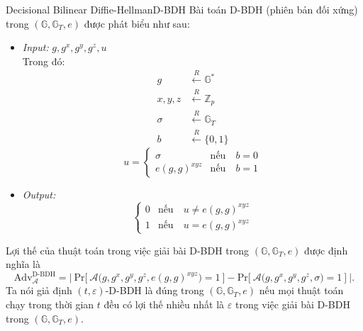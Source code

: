 \documentclass[class=report, crop=false]{standalone}
\begin{document}
		\begin{problem}{Decisional Bilinear Diffie-Hellman}{D-BDH}
			Bài toán D-BDH (phiên bản đối xứng) trong $(\mathbb{G}, \mathbb{G}_T, e)$ được phát biểu như sau:
			\vspace{-\baselineskip}
			\begin{itemize}[leftmargin=1.5cm, itemindent=-0.5cm]
				\item[] \textit{Input:} $g, g^x, g^y, g^z, u$ \\
				Trong đó: \vspace{-\baselineskip}
				\begin{align*}
					g 			&\xleftarrow{R} \mathbb{G}^* 	\\
					x, y, z 	&\xleftarrow{R} \mathbb{Z}_p 	\\
					\sigma 		&\xleftarrow{R} \mathbb{G}_T 	\\
					b 			&\xleftarrow{R} \{ 0, 1 \}
				\end{align*}
				\[
					u = \begin{cases}
						\sigma 			&\text{nếu}\quad b = 0 \\
						e(g, g)^{xyz} 	&\text{nếu}\quad b = 1
					\end{cases}
				\]
				\item[] \textit{Output:}
				\[
					\begin{cases}
						0 &\text{nếu}\quad u \neq e(g, g)^{xyz} \\
						1 &\text{nếu}\quad u = e(g, g)^{xyz}
					\end{cases}
				\]
			\end{itemize}
			\vspace{-\baselineskip}\par
			Lợi thế của thuật toán \algo trong việc giải bài D-BDH trong $(\mathbb{G}, \mathbb{G}_T, e)$ được định nghĩa là
			\[
					\text{Adv}_{\mathcal{A}}^{\text{D-BDH}} = \Bigg|\ \text{Pr}\bigg[ \ \mathcal{A}\Big(g, g^x, g^y, g^z, e(g, g)^{xyz} \Big) = 1 \ \bigg] - \text{Pr}\bigg[ \ \mathcal{A}\Big(g, g^x, g^y, g^z, \sigma \Big) = 1 \ \bigg]\ \Bigg|.
			\] \indent
			Ta nói giả định $(t, \varepsilon)$-D-BDH là đúng trong $(\mathbb{G}, \mathbb{G}_T, e)$ nếu mọi thuật toán chạy trong thời gian $t$ đều có lợi thế nhiều nhất là $\varepsilon$ trong việc giải bài D-BDH trong $(\mathbb{G}, \mathbb{G}_T, e)$.
		\end{problem}
\end{document}
